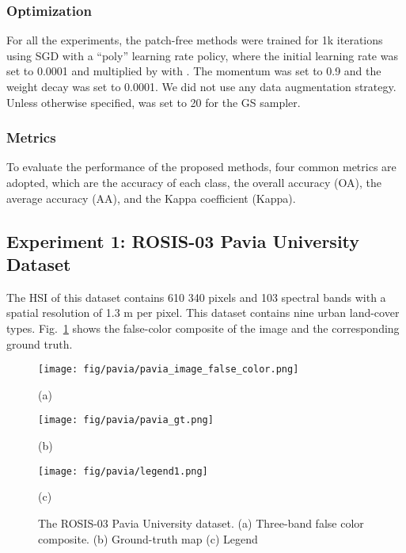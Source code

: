 \documentclass[journal]{IEEEtran}
\begin{document}
\subsubsection{\textbf{Optimization}}
For all the experiments, the patch-free methods were trained for 1k iterations using SGD with a ``poly'' learning rate policy, where the initial learning rate was set to 0.0001 and multiplied by  with .
The momentum was set to 0.9 and the weight decay was set to 0.0001.
We did not use any data augmentation strategy.
Unless otherwise specified,  was set to 20 for the GS sampler.

\subsubsection{\textbf{Metrics}}
To evaluate the performance of the proposed methods, four common metrics are adopted, which are the accuracy of each class, the overall accuracy (OA),  the average
accuracy (AA), and the Kappa coefficient (Kappa).




\subsection{Experiment 1: ROSIS-03 Pavia University Dataset}
\label{sec:exp1}

The HSI of this dataset contains 610  340 pixels and 103 spectral bands with a spatial resolution of 1.3 m per pixel.
This dataset contains nine urban land-cover types.
Fig.~\ref{fig:pavia_data} shows the false-color composite of the image and the corresponding ground truth.

\begin{figure}[htb]
  \begin{minipage}[b]{.30\linewidth}
    \centering
    \texttt{[image: fig/pavia/pavia\_image\_false\_color.png]}
    \centerline{(a)}
  \end{minipage}
  \hfill
  \begin{minipage}[b]{0.30\linewidth}
    \centering
    \texttt{[image: fig/pavia/pavia\_gt.png]}
    \centerline{(b)}
  \end{minipage}
  \hfill
  \begin{minipage}[b]{0.30\linewidth}
    \centering
    \texttt{[image: fig/pavia/legend1.png]}
    \centerline{(c)}
  \end{minipage}
  \caption{The ROSIS-03 Pavia University dataset.
    (a) Three-band false color composite.
    (b) Ground-truth map
    (c) Legend}
  \label{fig:pavia_data}
\end{figure}
\end{document}

